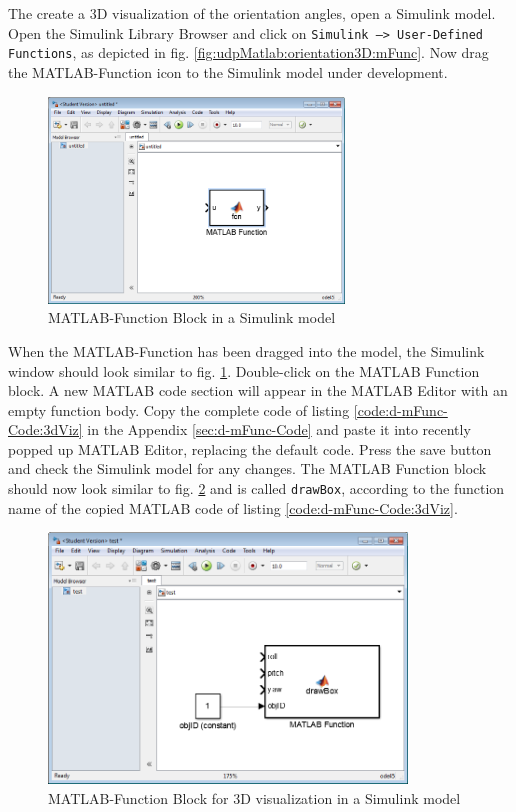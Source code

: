 The create a 3D visualization of the orientation angles, open a Simulink model. Open the Simulink Library Browser and click on \texttt{Simulink --> User-Defined Functions}, as depicted in fig. \ref{fig:udpMatlab:orientation3D:mFunc}. Now drag the MATLAB-Function icon to the Simulink model under development.

\begin{figure}[H]
    \centering
    \includegraphics[width=0.7\textwidth]{fig/ch-matlab-lib/matlabFunctionInModel}
    \caption{MATLAB-Function Block in a Simulink model}
    \label{fig:udpMatlab:orientation3D:mFuncInModel}
\end{figure}

When the MATLAB-Function has been dragged into the model, the Simulink window should look similar to fig. \ref{fig:udpMatlab:orientation3D:mFuncInModel}. Double-click on the MATLAB Function block. A new MATLAB code section will appear in the MATLAB Editor with an empty function body. Copy the complete code of listing \ref{code:d-mFunc-Code:3dViz} in the Appendix \ref{sec:d-mFunc-Code} and paste it into recently popped up MATLAB Editor, replacing the default code. Press the save button and check the Simulink model for any changes. The MATLAB Function block should now look similar to fig. \ref{fig:udpMatlab:orientation3D:mFuncInModelFinished} and is called \texttt{drawBox}, according to the function name of the copied MATLAB code of listing \ref{code:d-mFunc-Code:3dViz}.

\begin{figure}[H]
    \centering
    \includegraphics[width=0.85\textwidth]{fig/ch-matlab-lib/matlabFunctionInModel_finished}
    \caption{MATLAB-Function Block for 3D visualization in a Simulink model}
    \label{fig:udpMatlab:orientation3D:mFuncInModelFinished}
\end{figure}

